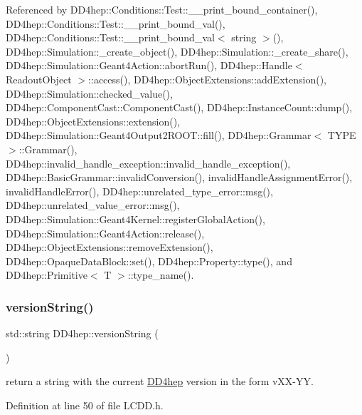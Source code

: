 Referenced by D\+D4hep\+::\+Conditions\+::\+Test\+::\+\_\+\+\_\+print\+\_\+bound\+\_\+container(), D\+D4hep\+::\+Conditions\+::\+Test\+::\+\_\+\+\_\+print\+\_\+bound\+\_\+val(), D\+D4hep\+::\+Conditions\+::\+Test\+::\+\_\+\+\_\+print\+\_\+bound\+\_\+val$<$ string $>$(), D\+D4hep\+::\+Simulation\+::\+\_\+create\+\_\+object(), D\+D4hep\+::\+Simulation\+::\+\_\+create\+\_\+share(), D\+D4hep\+::\+Simulation\+::\+Geant4\+Action\+::abort\+Run(), D\+D4hep\+::\+Handle$<$ Readout\+Object $>$\+::access(), D\+D4hep\+::\+Object\+Extensions\+::add\+Extension(), D\+D4hep\+::\+Simulation\+::checked\+\_\+value(), D\+D4hep\+::\+Component\+Cast\+::\+Component\+Cast(), D\+D4hep\+::\+Instance\+Count\+::dump(), D\+D4hep\+::\+Object\+Extensions\+::extension(), D\+D4hep\+::\+Simulation\+::\+Geant4\+Output2\+R\+O\+O\+T\+::fill(), D\+D4hep\+::\+Grammar$<$ T\+Y\+P\+E $>$\+::\+Grammar(), D\+D4hep\+::invalid\+\_\+handle\+\_\+exception\+::invalid\+\_\+handle\+\_\+exception(), D\+D4hep\+::\+Basic\+Grammar\+::invalid\+Conversion(), invalid\+Handle\+Assignment\+Error(), invalid\+Handle\+Error(), D\+D4hep\+::unrelated\+\_\+type\+\_\+error\+::msg(), D\+D4hep\+::unrelated\+\_\+value\+\_\+error\+::msg(), D\+D4hep\+::\+Simulation\+::\+Geant4\+Kernel\+::register\+Global\+Action(), D\+D4hep\+::\+Simulation\+::\+Geant4\+Action\+::release(), D\+D4hep\+::\+Object\+Extensions\+::remove\+Extension(), D\+D4hep\+::\+Opaque\+Data\+Block\+::set(), D\+D4hep\+::\+Property\+::type(), and D\+D4hep\+::\+Primitive$<$ T $>$\+::type\+\_\+name().

\hypertarget{namespace_d_d4hep_ad8fb70d431a1af32b6220b348af93c60}{}\label{namespace_d_d4hep_ad8fb70d431a1af32b6220b348af93c60} 
\subsubsection{\texorpdfstring{version\+String()}{versionString()}}
{\footnotesize\ttfamily std\+::string D\+D4hep\+::version\+String (\begin{DoxyParamCaption}{ }\end{DoxyParamCaption})\hspace{0.3cm}{\ttfamily [inline]}}



return a string with the current \hyperlink{namespace_d_d4hep}{D\+D4hep} version in the form v\+X\+X-\/\+YY. 



Definition at line 50 of file L\+C\+D\+D.\+h.



